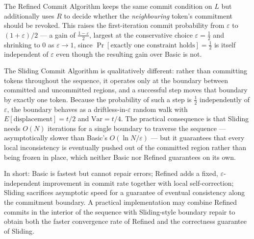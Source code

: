 \documentclass[a4paper,11pt]{llncs}
\begin{document}
The Refined Commit Algorithm keeps the same commit condition on $L$
but additionally uses $R$ to decide whether the \emph{neighbouring}
token's commitment should be revoked. 
This raises the first-iteration commit probability from $\varepsilon$ to $(1+\varepsilon)/2$
--- a gain of $\frac{1-\varepsilon}{2}$, largest at the conservative choice $\varepsilon=\frac12$
and shrinking to $0$ as $\varepsilon\to1$, since $\Pr[\text{exactly one constraint holds}]=\frac12$
is itself independent of $\varepsilon$ even though the resulting gain over Basic is not.

The Sliding Commit Algorithm is qualitatively different: rather than
committing tokens throughout the sequence, it operates only at the
boundary between committed and uncommitted regions, and a successful
step moves that boundary by exactly one token. Because the probability
of such a step is $\tfrac12$ independently of $\varepsilon$, the
boundary behaves as a driftless-in-$\varepsilon$ random walk with
$E[\text{displacement}]=t/2$ and $\mathrm{Var}=t/4$. The
practical consequence is that Sliding needs $O(N)$ iterations for a
single boundary to traverse the sequence --- asymptotically slower
than Basic's $O(\ln N/\varepsilon)$ --- but it guarantees that every
local inconsistency is eventually pushed out of the committed region
rather than being frozen in place, which neither Basic nor Refined
guarantees on its own.

In short: Basic is fastest but cannot repair errors; Refined adds a
fixed, $\varepsilon$-independent improvement in commit rate together
with local self-correction; Sliding sacrifices asymptotic speed for a
guarantee of eventual consistency along the commitment boundary. A
practical implementation may combine Refined commits in the interior
of the sequence with Sliding-style boundary repair to obtain both the
faster convergence rate of Refined and the correctness guarantee of
Sliding.
\end{document}
